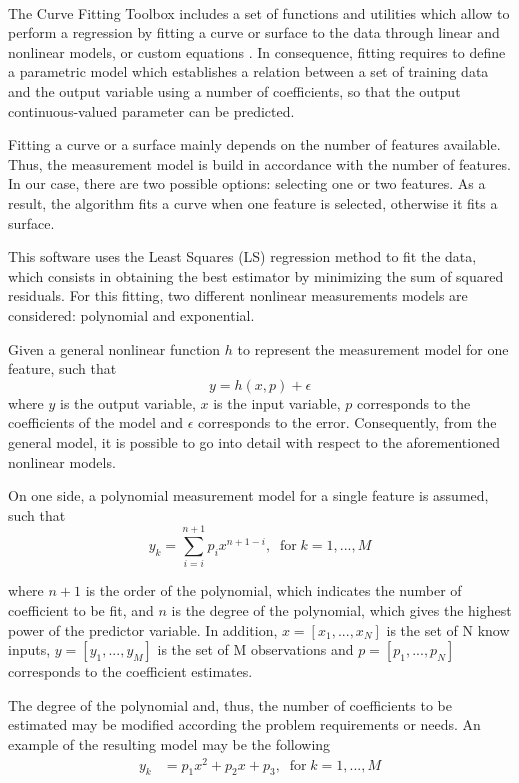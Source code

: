 \documentclass[a4paper, report, oneside, UKenglish]{memoir}
\begin{document}
The Curve Fitting Toolbox\textsuperscript{\tiny\texttrademark} includes a set of functions and utilities which allow to perform a regression by fitting a curve or surface to the data through linear and nonlinear models, or custom equations \cite{MathWorksRegression}. In consequence, fitting requires to define a parametric model which establishes a relation between a set of training data and the output variable using a number of coefficients, so that the output continuous-valued parameter can be predicted. 

Fitting a curve or a surface mainly depends on the number of features available. Thus, the measurement model is build in accordance with the number of features. In our case, there are two possible options: selecting one or two features. As a result, the algorithm fits a curve when one feature is selected, otherwise it fits a surface.

This software uses the Least Squares (LS) regression method to fit the data, which consists in obtaining the best estimator by minimizing the sum of squared residuals. For this fitting, two different nonlinear measurements models are considered: polynomial and exponential. 

Given a general nonlinear function $h$ to represent the measurement model for one feature, such that
\begin{equation}
    y = h(x,p) + \epsilon
\end{equation}
where $y$ is the output variable, $x$ is the input variable, $p$ corresponds to the coefficients of the model and $\epsilon$ corresponds to the error. Consequently, from the general model, it is possible to go into detail with respect to the aforementioned nonlinear models. 

On one side, a polynomial measurement model for a single feature is assumed, such that
\begin{equation}
    y_k = \sum\limits_{i=i}^{n+1} p_{i}x^{n+1-i},  \;\;\mbox{for}\; k = 1,...,M
\end{equation}

where $n+1$ is the order of the polynomial, which indicates the number of coefficient to be fit, and $n$ is the degree of the polynomial, which gives the highest power of the predictor variable. In addition, $x = [x_1,...,x_N]$ is the set of N know inputs, $y = [y_1,...,y_M]$ is the set of M observations and $p = [p_1,...,p_N]$ corresponds to the coefficient estimates.

The degree of the polynomial and, thus, the number of coefficients to be estimated may be modified according the problem requirements or needs. 
An example of the resulting model may be the following
\begin{equation}
\begin{split}
    y_k &= p_{1}x^{2} + p_{2}x + p_3,    \;\;\mbox{for}\; k = 1,...,M
\end{split}
\end{equation}
\end{document}

